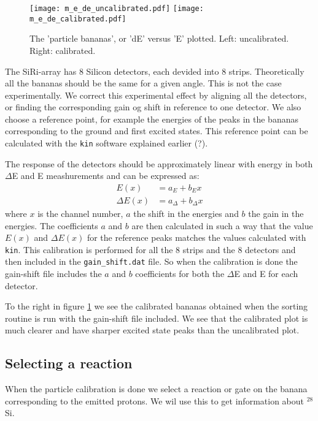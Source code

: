\documentclass[11pt,a4wide]{article}
\begin{document}
\begin{figure}[htp]
\centering
\texttt{[image: m\_e\_de\_uncalibrated.pdf]}
\texttt{[image: m\_e\_de\_calibrated.pdf]} %
\caption{The 'particle bananas', or 'dE' versus 'E' plotted. Left: uncalibrated. Right: calibrated.}
\label{fig: de_e}
\end{figure}

The SiRi-array has 8 Silicon detectors, each devided into 8 strips. Theoretically all the bananas should be the same for a given angle. This is not the case experimentally. We correct this experimental effect by aligning all the detectors, or finding the corresponding gain og shift in reference to one detector. We also choose a reference point, for example the energies of the peaks in the bananas corresponding to the ground and first excited states. This reference point can be calculated with the \texttt{kin} software explained earlier (?). %

The response of the detectors should be approximately linear with energy in both $\Delta$E and E meashurements and can be expressed as:
\begin{align*}
E(x) &= a_E + b_Ex\\
\Delta E(x) &= a_\Delta + b_\Delta x
\end{align*}
where $x$ is the channel number, $a$ the shift in the energies and $b$ the gain in the energies. The coefficients $a$ and $b$ are then calculated in such a way that the value $E(x)$ and $\Delta E(x)$ for the reference peaks matches the values calculated with \texttt{kin}. This calibration is performed for all the 8 strips and the 8 detectors and then included in the \texttt{gain\_shift.dat} file. So when the calibration is done the gain-shift file includes the $a$ and $b$ coefficients for both the $\Delta$E and E for each detector.

To the right in figure \ref{fig: de_e} we see the calibrated bananas obtained when the sorting routine is run with the gain-shift file included. We see that the calibrated plot is much clearer and have sharper excited state peaks than the uncalibrated plot. 

\subsection{Selecting a reaction}
When the particle calibration is done we select a reaction or gate on the banana corresponding to the emitted protons. We wil use this to get information about ${}^28$Si. 
\end{document}
